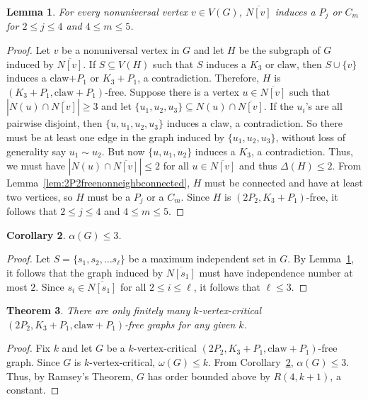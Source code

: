 \documentclass[11pt]{article}
\newtheorem{theorem}{Theorem}[section]
\newtheorem{lemma}[theorem]{Lemma}
\newtheorem{corollary}[theorem]{Corollary}
\theoremstyle{definition}
\newcommand{\noneighbs}{\overline{N[v]}}
\begin{document}
\begin{lemma}\label{lem:pathorcyclenonneighbourhood}
For every nonuniversal vertex $v\in V(G)$, $\noneighbs$ induces a $P_j$ or $C_m$ for $2\le j\le 4$ and $4\le m\le 5$.
\end{lemma}
\begin{proof}
Let $v$ be a nonuniversal vertex in $G$ and let $H$ be the subgraph of $G$ induced by $\noneighbs$. If $S\subseteq V(H)$ such that $S$ induces a $K_3$ or claw, then $S\cup\{v\}$ induces a claw$+P_1$ or $K_3+P_1$, a contradiction. Therefore, $H$ is $(K_3+P_1,\text{claw}+P_1)$-free. Suppose there is a vertex $u\in \noneighbs$ such that $|N(u)\cap \noneighbs|\ge 3$ and let $\{u_1,u_2,u_3\}\subseteq N(u)\cap \noneighbs$. If the $u_i$'s are all pairwise disjoint, then $\{u,u_1,u_2,u_3\}$ induces a claw, a contradiction. So there must be at least one edge in the graph induced by $\{u_1,u_2,u_3\}$, without loss of generality say $u_1\sim u_2$. But now $\{u,u_1,u_2\}$ induces a $K_3$, a contradiction. Thus, we must have $|N(u)\cap \noneighbs|\le 2$ for all $u\in \noneighbs$ and thus $\Delta(H)\le 2$. From Lemma~\ref{lem:2P2freenonneighbconnected}, $H$ must be connected and have at least two vertices, so $H$ must be a $P_j$ or a $C_m$. Since $H$ is $(2P_2,K_3+P_1)$-free, it follows that $2\le j\le 4$ and $4\le m\le 5$. 
\end{proof}


\begin{corollary}\label{cor:indnumatmost3}
$\alpha(G)\le 3$.
\end{corollary}
\begin{proof}
Let $S=\{s_1,s_2,\dots s_{\ell}\}$ be a maximum independent set in $G$. By Lemma~\ref{lem:pathorcyclenonneighbourhood}, it follows that the graph induced by $\overline{N[s_1]}$ must have independence number at most $2$. Since $s_i\in \overline{N[s_1]}$ for all $2\le i\le \ell$, it follows that $\ell\le 3$.
\end{proof}


\begin{theorem}
There are only finitely many $k$-vertex-critical $(2P_2, K_3 + P_1, \text{claw} + P_1)$-free graphs for any given $k$.
\end{theorem}
\begin{proof}
Fix $k$ and let $G$ be a $k$-vertex-critical $(2P_2, K_3 + P_1, \text{claw} + P_1)$-free graph. Since $G$ is $k$-vertex-critical, $\omega(G)\le k$. From Corollary~\ref{cor:indnumatmost3}, $\alpha(G)\le 3$. Thus, by Ramsey's Theorem, $G$ has order bounded above by $R(4,k+1)$, a constant.
\end{proof}
\end{document}
